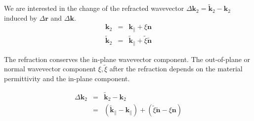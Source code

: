 \documentclass[12pt,a4paper,twoside,openright,BCOR10mm,headsepline,titlepage,abstracton,chapterprefix,final]{scrreprt}
\newcommand\Vector[1]{{\mathbf{#1}}}
\newcommand\wavenumber{k}
\newcommand\Wavevector{\Vector{\wavenumber}}
\begin{document}
We are interested in the change of the refracted wavevector $\Delta\Wavevector_2 = \tilde{\Wavevector}_2 - \Wavevector_2$ induced by $\Delta\Vector{r}$ and $\Delta\Wavevector$.
\begin{eqnarray}
 \Wavevector_2 &=& \Wavevector_{\parallel} + \xi \Vector{n} 
 \\
 \tilde{\Wavevector}_2 &=& \tilde{\Wavevector}_{\parallel} + \tilde{\xi} \tilde{\Vector{n}} 
\end{eqnarray}

The refraction conserves the in-plane wavevector component. 
The out-of-plane or normal wavevector component $\xi, \tilde{\xi}$ after the refraction depends on the material permittivity and the in-plane component.

\begin{eqnarray}
 \Delta\Wavevector_2 &=& \tilde{\Wavevector}_2 - \Wavevector_2 \\
 &=& ( \tilde{\Wavevector}_{\parallel} - \Wavevector_{\parallel} ) + ( \tilde{\xi} \tilde{\Vector{n}} - \xi \Vector{n} ) \\

\end{eqnarray}
\end{document}
